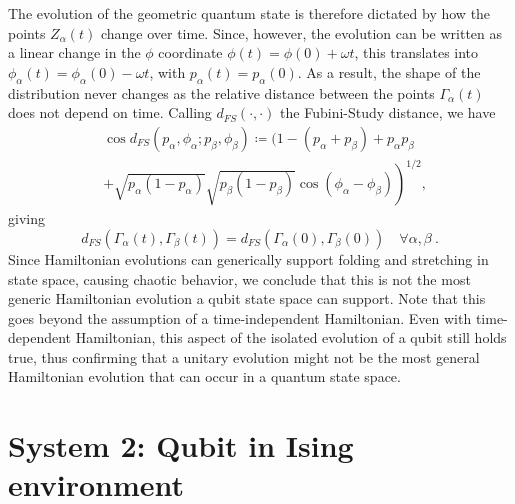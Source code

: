 \documentclass[draft,nofootinbib,pre,twocolumn,showpacs,showkeys,preprintnumbers,floatfix]{revtex4-1}
\newcommand{\1}{\mathbbm{1}}
\begin{document}
The evolution of the geometric quantum state is therefore dictated by how 
the points $Z_\alpha(t)$ change over time. Since, however, the evolution 
can be written as a linear change in the $\phi$ coordinate $\phi(t)=\phi(0)+\omega t$, this translates
into $\phi_\alpha(t) = \phi_\alpha(0)- \omega t$, with $p_\alpha(t)=p_\alpha(0)$.
As a result, the shape of the distribution never changes as the relative distance
between the points $\Gamma_\alpha(t)$ does not depend on time. Calling $d_{FS}(\cdot,\cdot)$
the Fubini-Study distance, we have
\begin{align}
&\cos d_{FS}(p_\alpha, \phi_\alpha;p_\beta,\phi_\beta) \coloneqq \Big(1-(p_\alpha+p_\beta)+p_\alpha p_\beta \nonumber \\
&\left. +\sqrt{p_\alpha(1-p_\alpha)}\sqrt{p_\beta(1-p_\beta)}\cos (\phi_\alpha-\phi_\beta)\right)^{1/2},
\end{align}
giving
\begin{equation}
d_{FS}(\Gamma_\alpha(t),\Gamma_\beta(t))=d_{FS}(\Gamma_\alpha(0),\Gamma_\beta(0)) \quad \forall \alpha,\beta~.
\end{equation}
Since Hamiltonian evolutions can generically support folding and stretching 
in state space, causing chaotic behavior, we conclude that this is not the 
most generic Hamiltonian evolution a qubit state space can support. Note
that this goes beyond the assumption of a time-independent Hamiltonian.
Even with time-dependent Hamiltonian, this aspect of the isolated evolution
of a qubit still holds true, thus confirming that a unitary evolution might not be
the most general Hamiltonian evolution that can occur in a quantum state space.

\section{System 2: Qubit in Ising environment}
\label{sec:EXAMPLES2}
\end{document}
